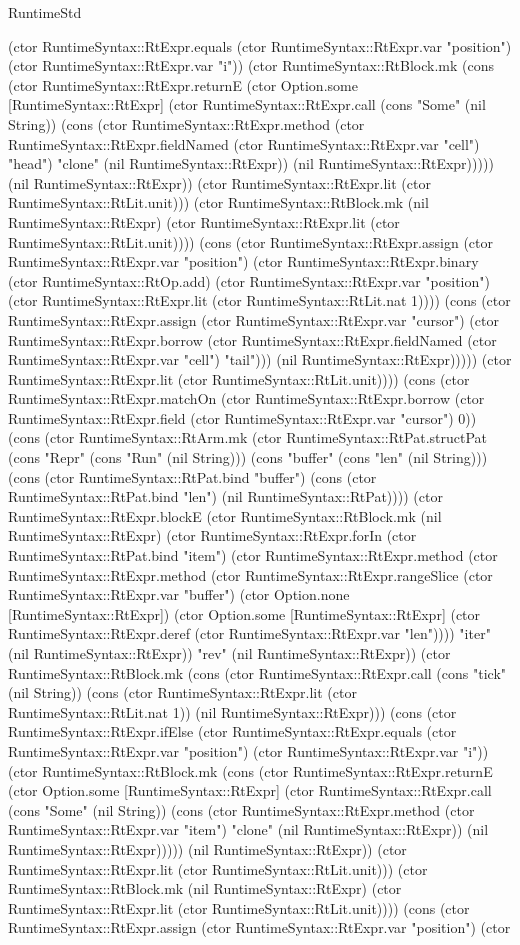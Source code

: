 \begin{lexlean}{RuntimeStd}
\begin{semanticmodule}
{(ctor RuntimeSyntax::RtExpr.equals (ctor RuntimeSyntax::RtExpr.var "position") (ctor RuntimeSyntax::RtExpr.var "i")) (ctor RuntimeSyntax::RtBlock.mk (cons (ctor RuntimeSyntax::RtExpr.returnE (ctor Option.some [RuntimeSyntax::RtExpr] (ctor RuntimeSyntax::RtExpr.call (cons "Some" (nil String)) (cons (ctor RuntimeSyntax::RtExpr.method (ctor RuntimeSyntax::RtExpr.fieldNamed (ctor RuntimeSyntax::RtExpr.var "cell") "head") "clone" (nil RuntimeSyntax::RtExpr)) (nil RuntimeSyntax::RtExpr))))) (nil RuntimeSyntax::RtExpr)) (ctor RuntimeSyntax::RtExpr.lit (ctor RuntimeSyntax::RtLit.unit))) (ctor RuntimeSyntax::RtBlock.mk (nil RuntimeSyntax::RtExpr) (ctor RuntimeSyntax::RtExpr.lit (ctor RuntimeSyntax::RtLit.unit)))) (cons (ctor RuntimeSyntax::RtExpr.assign (ctor RuntimeSyntax::RtExpr.var "position") (ctor RuntimeSyntax::RtExpr.binary (ctor RuntimeSyntax::RtOp.add) (ctor RuntimeSyntax::RtExpr.var "position") (ctor RuntimeSyntax::RtExpr.lit (ctor RuntimeSyntax::RtLit.nat 1)))) (cons (ctor RuntimeSyntax::RtExpr.assign (ctor RuntimeSyntax::RtExpr.var "cursor") (ctor RuntimeSyntax::RtExpr.borrow (ctor RuntimeSyntax::RtExpr.fieldNamed (ctor RuntimeSyntax::RtExpr.var "cell") "tail"))) (nil RuntimeSyntax::RtExpr))))) (ctor RuntimeSyntax::RtExpr.lit (ctor RuntimeSyntax::RtLit.unit)))) (cons (ctor RuntimeSyntax::RtExpr.matchOn (ctor RuntimeSyntax::RtExpr.borrow (ctor RuntimeSyntax::RtExpr.field (ctor RuntimeSyntax::RtExpr.var "cursor") 0)) (cons (ctor RuntimeSyntax::RtArm.mk (ctor RuntimeSyntax::RtPat.structPat (cons "Repr" (cons "Run" (nil String))) (cons "buffer" (cons "len" (nil String))) (cons (ctor RuntimeSyntax::RtPat.bind "buffer") (cons (ctor RuntimeSyntax::RtPat.bind "len") (nil RuntimeSyntax::RtPat)))) (ctor RuntimeSyntax::RtExpr.blockE (ctor RuntimeSyntax::RtBlock.mk (nil RuntimeSyntax::RtExpr) (ctor RuntimeSyntax::RtExpr.forIn (ctor RuntimeSyntax::RtPat.bind "item") (ctor RuntimeSyntax::RtExpr.method (ctor RuntimeSyntax::RtExpr.method (ctor RuntimeSyntax::RtExpr.rangeSlice (ctor RuntimeSyntax::RtExpr.var "buffer") (ctor Option.none [RuntimeSyntax::RtExpr]) (ctor Option.some [RuntimeSyntax::RtExpr] (ctor RuntimeSyntax::RtExpr.deref (ctor RuntimeSyntax::RtExpr.var "len")))) "iter" (nil RuntimeSyntax::RtExpr)) "rev" (nil RuntimeSyntax::RtExpr)) (ctor RuntimeSyntax::RtBlock.mk (cons (ctor RuntimeSyntax::RtExpr.call (cons "tick" (nil String)) (cons (ctor RuntimeSyntax::RtExpr.lit (ctor RuntimeSyntax::RtLit.nat 1)) (nil RuntimeSyntax::RtExpr))) (cons (ctor RuntimeSyntax::RtExpr.ifElse (ctor RuntimeSyntax::RtExpr.equals (ctor RuntimeSyntax::RtExpr.var "position") (ctor RuntimeSyntax::RtExpr.var "i")) (ctor RuntimeSyntax::RtBlock.mk (cons (ctor RuntimeSyntax::RtExpr.returnE (ctor Option.some [RuntimeSyntax::RtExpr] (ctor RuntimeSyntax::RtExpr.call (cons "Some" (nil String)) (cons (ctor RuntimeSyntax::RtExpr.method (ctor RuntimeSyntax::RtExpr.var "item") "clone" (nil RuntimeSyntax::RtExpr)) (nil RuntimeSyntax::RtExpr))))) (nil RuntimeSyntax::RtExpr)) (ctor RuntimeSyntax::RtExpr.lit (ctor RuntimeSyntax::RtLit.unit))) (ctor RuntimeSyntax::RtBlock.mk (nil RuntimeSyntax::RtExpr) (ctor RuntimeSyntax::RtExpr.lit (ctor RuntimeSyntax::RtLit.unit)))) (cons (ctor RuntimeSyntax::RtExpr.assign (ctor RuntimeSyntax::RtExpr.var "position") (ctor }
\end{semanticmodule}
\end{lexlean}
